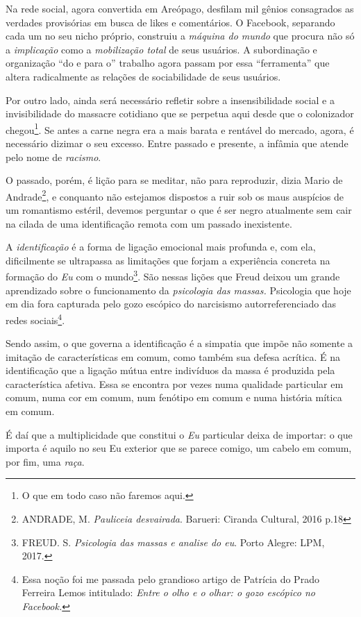 Na rede social, agora convertida em Areópago, desfilam mil gênios
consagrados as verdades provisórias em busca de likes e comentários. O
Facebook, separando cada um no seu nicho próprio, construiu a
\emph{máquina do mundo} que procura não só a \emph{implicação} como a
\emph{mobilização total} de seus usuários. A subordinação e organização
``do e para o'' trabalho agora passam por essa ``ferramenta'' que altera
radicalmente as relações de sociabilidade de seus usuários.

Por outro lado, ainda será necessário refletir sobre a insensibilidade
social e a invisibilidade do massacre cotidiano que se perpetua aqui
desde que o colonizador chegou\footnote{O que em todo caso não faremos
  aqui.}. Se antes a carne negra era a mais barata e rentável do
mercado, agora, é necessário dizimar o seu excesso. Entre passado e
presente, a infâmia que atende pelo nome de \emph{racismo}.

O passado, porém, é lição para se meditar, não para reproduzir, dizia
Mario de Andrade\footnote{ANDRADE, M. \emph{Pauliceia desvairada}.
  Barueri: Ciranda Cultural, 2016 p.18}, e conquanto não estejamos
dispostos a ruir sob os maus auspícios de um romantismo estéril, devemos
perguntar o que é ser negro atualmente sem cair na cilada de uma
identificação remota com um passado inexistente.

A \emph{identificação} é a forma de ligação emocional mais profunda e,
com ela, dificilmente se ultrapassa as limitações que forjam a
experiência concreta na formação do \emph{Eu} com o mundo\footnote{FREUD.
  S. \emph{Psicologia das massas e analise do eu}. Porto Alegre: LPM,
  2017.}. São nessas lições que Freud deixou um grande aprendizado sobre
o funcionamento da \emph{psicologia das massas.} Psicologia que hoje em
dia fora capturada pelo gozo escópico do narcisismo autorreferenciado
das redes sociais\footnote{Essa noção foi me passada pelo grandioso
  artigo de Patrícia do Prado Ferreira Lemos intitulado: \emph{Entre o
  olho e o olhar: o gozo escópico no Facebook.}}.

Sendo assim, o que governa a identificação é a simpatia que impõe não
somente a imitação de características em comum, como também sua defesa
acrítica. É na identificação que a ligação mútua entre indivíduos da
massa é produzida pela característica afetiva. Essa se encontra por
vezes numa qualidade particular em comum, numa cor em comum, num
fenótipo em comum e numa história mítica em comum.

É daí que a multiplicidade que constitui o \emph{Eu} particular deixa de
importar: o que importa é aquilo no seu Eu exterior que se parece
comigo, um cabelo em comum, por fim, uma \emph{raça}.

